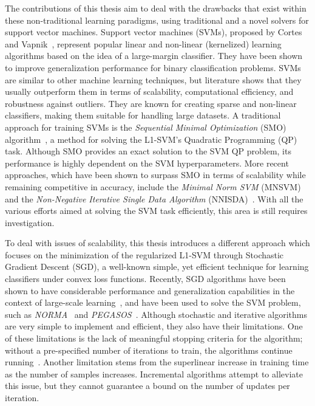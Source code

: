 \documentclass[reqno]{vcuthesis}
\numberwithin{equation}{chapter}
\begin{document}
The contributions of this thesis aim to deal with the drawbacks that exist within these non-traditional learning paradigms, using traditional and a novel solvers for support vector machines. Support vector machines (SVMs), proposed by Cortes and Vapnik~\cite{Cortes1995}, represent popular linear and non-linear (kernelized) learning algorithms based on the idea of a large-margin classifier. They have been shown to improve generalization performance for binary classification problems. SVMs are similar to other machine learning techniques, but literature shows that they usually outperform them in terms of scalability, computational efficiency, and robustness against outliers. They are known for creating sparse and non-linear classifiers, making them suitable for handling large datasets. A traditional approach for training SVMs is the \textit{Sequential Minimal Optimization} (SMO) algorithm~\cite{Platt1998}, a method for solving the L1-SVM's Quadratic Programming (QP) task. Although SMO provides an exact solution to the SVM QP problem, its performance is highly dependent on the SVM hyperparameters. More recent approaches, which have been shown to surpass SMO in terms of scalability while remaining competitive in accuracy, include the \textit{Minimal Norm SVM} (MNSVM)~\cite{strack2013geometric} and the \textit{Non-Negative Iterative Single Data Algorithm} (NNISDA)~\cite{Kecman2014,zigic2016}. With all the various efforts aimed at solving the SVM task efficiently, this area is still requires investigation.

To deal with issues of scalability, this thesis introduces a different approach which focuses on the minimization of the regularized L1-SVM through Stochastic Gradient Descent (SGD), a well-known simple, yet efficient technique for learning classifiers under convex loss functions. Recently, SGD algorithms have been shown to have considerable performance and generalization capabilities in the context of large-scale learning~\cite{bottou2010large}, and have been used to solve the SVM problem, such as \textit{NORMA}~\cite{kivinen2004online} and \textit{PEGASOS}~\cite{shalev2011pegasos,zhang2004solving}. Although stochastic and iterative algorithms are very simple to implement and efficient, they also have their limitations. One of these limitations is the lack of meaningful stopping criteria for the algorithm; without a pre-specified number of iterations to train, the algorithms continue running~\cite{panagiotakopoulos2013stochastic}. Another limitation stems from the superlinear increase in training time as the number of samples increases. Incremental algorithms attempt to alleviate this issue, but they cannot guarantee a bound on the number of updates per iteration. 
\end{document}
